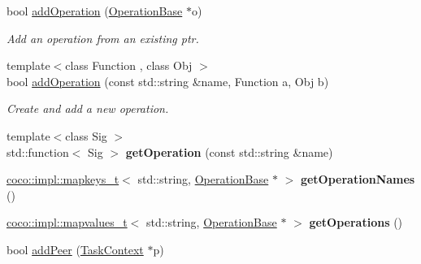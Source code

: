 \begin{DoxyCompactItemize}
\item 
\hypertarget{classcoco_1_1_service_ae0781be1829827b69d055fa89c8625c6}{}bool \hyperlink{classcoco_1_1_service_ae0781be1829827b69d055fa89c8625c6}{add\+Operation} (\hyperlink{classcoco_1_1_operation_base}{Operation\+Base} $\ast$o)\label{classcoco_1_1_service_ae0781be1829827b69d055fa89c8625c6}

\begin{DoxyCompactList}\small\item\em Add an operation from an existing ptr. \end{DoxyCompactList}\item 
\hypertarget{classcoco_1_1_service_a3ce8fa79ff5c68593d6a8229a95d396d}{}{\footnotesize template$<$class Function , class Obj $>$ }\\bool \hyperlink{classcoco_1_1_service_a3ce8fa79ff5c68593d6a8229a95d396d}{add\+Operation} (const std\+::string \&name, Function a, Obj b)\label{classcoco_1_1_service_a3ce8fa79ff5c68593d6a8229a95d396d}

\begin{DoxyCompactList}\small\item\em Create and add a new operation. \end{DoxyCompactList}\item 
\hypertarget{classcoco_1_1_service_a2649fc0bfef1e23b57d29bdf0a15e2d9}{}{\footnotesize template$<$class Sig $>$ }\\std\+::function$<$ Sig $>$ {\bfseries get\+Operation} (const std\+::string \&name)\label{classcoco_1_1_service_a2649fc0bfef1e23b57d29bdf0a15e2d9}

\item 
\hypertarget{classcoco_1_1_service_aeadc3b0259dabdcecd6e56d1a6c9a6ed}{}\hyperlink{structcoco_1_1impl_1_1mapkeys__t}{coco\+::impl\+::mapkeys\+\_\+t}$<$ std\+::string, \hyperlink{classcoco_1_1_operation_base}{Operation\+Base} $\ast$ $>$ {\bfseries get\+Operation\+Names} ()\label{classcoco_1_1_service_aeadc3b0259dabdcecd6e56d1a6c9a6ed}

\item 
\hypertarget{classcoco_1_1_service_a87fe2c6d833f37972774086c16a0cc80}{}\hyperlink{structcoco_1_1impl_1_1mapvalues__t}{coco\+::impl\+::mapvalues\+\_\+t}$<$ std\+::string, \hyperlink{classcoco_1_1_operation_base}{Operation\+Base} $\ast$ $>$ {\bfseries get\+Operations} ()\label{classcoco_1_1_service_a87fe2c6d833f37972774086c16a0cc80}

\item 
\hypertarget{classcoco_1_1_service_a452f324bff06c6d9f13a9c04b0184a13}{}bool \hyperlink{classcoco_1_1_service_a452f324bff06c6d9f13a9c04b0184a13}{add\+Peer} (\hyperlink{classcoco_1_1_task_context}{Task\+Context} $\ast$p)\label{classcoco_1_1_service_a452f324bff06c6d9f13a9c04b0184a13}


\end{DoxyCompactItemize}
